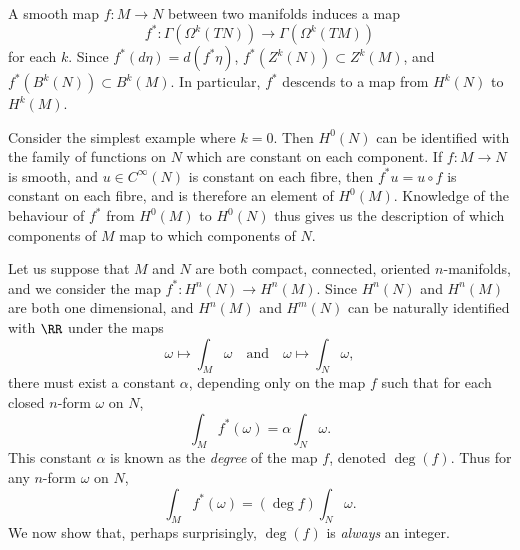 A smooth map $f: M \to N$ between two manifolds induces a map
%
\[ f^*: \Gamma(\Omega^k(TN)) \to \Gamma(\Omega^k(TM)) \]
%
for each $k$. Since $f^*(d\eta) = d(f^* \eta)$, $f^*(Z^k(N)) \subset Z^k(M)$, and $f^*(B^k(N)) \subset B^k(M)$. In particular, $f^*$ descends to a map from $H^k(N)$ to $H^k(M)$.

\begin{example}
    Consider the simplest example where $k = 0$. Then $H^0(N)$ can be identified with the family of functions on $N$ which are constant on each component. If $f: M \to N$ is smooth, and $u \in C^\infty(N)$ is constant on each fibre, then $f^* u = u \circ f$ is constant on each fibre, and is therefore an element of $H^0(M)$. Knowledge of the behaviour of $f^*$ from $H^0(M)$ to $H^0(N)$ thus gives us the description of which components of $M$ map to which components of $N$.
\end{example}

Let us suppose that $M$ and $N$ are both compact, connected, oriented $n$-manifolds, and we consider the map $f^*: H^n(N) \to H^n(M)$. Since $H^n(N)$ and $H^n(M)$ are both one dimensional, and $H^n(M)$ and $H^m(N)$ can be naturally identified with $\RR$ under the maps
%
\[ \omega \mapsto \int_M \omega \quad\text{and}\quad \omega \mapsto \int_N \omega, \]
%
there must exist a constant $\alpha$, depending only on the map $f$ such that for each closed $n$-form $\omega$ on $N$,
%
\[ \int_M f^*(\omega) = \alpha \int_N \omega. \]
%
This constant $\alpha$ is known as the \emph{degree} of the map $f$, denoted $\deg(f)$. Thus for any $n$-form $\omega$ on $N$,
%
\[ \int_M f^*(\omega) = (\deg f) \int_N \omega. \]
%
We now show that, perhaps surprisingly, $\deg(f)$ is \emph{always} an integer.

